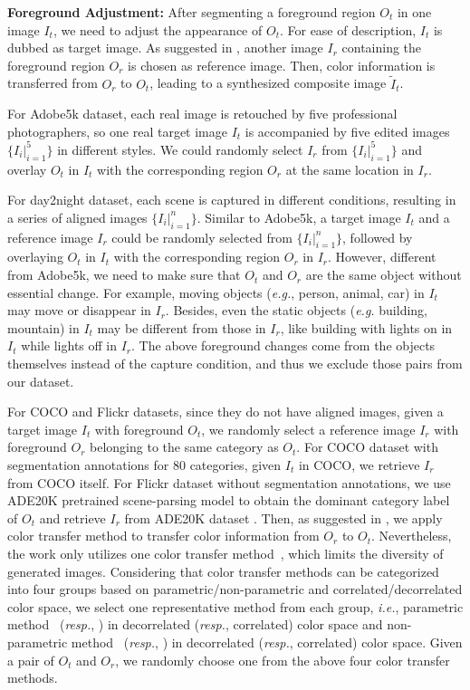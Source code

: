 \documentclass[10pt,twocolumn,letterpaper]{article}
\begin{document}
\noindent\textbf{Foreground Adjustment: }After segmenting a foreground region $O_t$ in one image $I_t$, we need to adjust the appearance of $O_t$. For ease of description, $I_t$ is dubbed as target image. As suggested in \cite{tsai2017deep}, another image $I_r$ containing the foreground region $O_r$ is chosen as reference image. Then, color information is transferred from $O_r$ to $O_t$, leading to a synthesized composite image $\tilde{I}_t$.

For Adobe5k dataset, each real image is retouched by five professional photographers, so one real target image $I_t$ is accompanied by five edited images $\{I_i|_{i=1}^5\}$ in different styles. We could randomly select $I_r$ from $\{I_i|_{i=1}^5\}$ and overlay $O_t$ in $I_t$ with the corresponding region $O_r$ at the same location in $I_r$.

For day2night dataset, each scene is captured in different conditions, resulting in a series of aligned images $\{I_i|_{i=1}^n\}$. Similar to Adobe5k, a target image $I_t$ and a reference image $I_r$ could be randomly selected from $\{I_i|_{i=1}^n\}$, followed by overlaying $O_t$ in $I_t$ with the corresponding region $O_r$ in $I_r$. However, different from Adobe5k, we need to make sure that $O_t$ and $O_r$ are the same object without essential change. For example, moving objects (\emph{e.g.}, person, animal, car) in $I_t$ may move or disappear in $I_r$. Besides, even the static objects (\emph{e.g.} building, mountain) in $I_t$ may be different from those in $I_r$, like building with lights on in $I_t$ while lights off in $I_r$. The above foreground changes come from the objects themselves instead of the capture condition, and thus we exclude those pairs from our dataset.

For COCO and Flickr datasets, since they do not have aligned images, given a target image $I_t$ with foreground $O_t$, we randomly select a reference image $I_r$ with foreground $O_r$ belonging to the same category as $O_t$. For COCO dataset with segmentation annotations for 80 categories, given $I_t$ in COCO, we retrieve $I_r$ from COCO itself. For Flickr dataset without segmentation annotations, we use ADE20K pretrained scene-parsing model \cite{zhou2019semantic} to obtain the dominant category label of $O_t$ and retrieve $I_r$ from ADE20K dataset \cite{zhou2019semantic}. Then, as suggested in \cite{tsai2017deep}, we apply color transfer method to transfer color information from $O_r$ to $O_t$. Nevertheless, the work \cite{tsai2017deep} only utilizes one color transfer method~\cite{lee2016automatic}, which limits the diversity of generated images. Considering that color transfer methods can be categorized into four groups based on parametric/non-parametric and correlated/decorrelated color space, we select one representative method from each group, \emph{i.e.}, parametric method~\cite{reinhard2001color} (\emph{resp.}, \cite{xiao2006color}) in decorrelated (\emph{resp.}, correlated) color space and non-parametric method~\cite{fecker2008histogram} (\emph{resp.}, \cite{pitie2007automated}) in decorrelated (\emph{resp.}, correlated) color space. Given a pair of $O_t$ and $O_r$, we randomly choose one from the above four color transfer methods.
\end{document}
